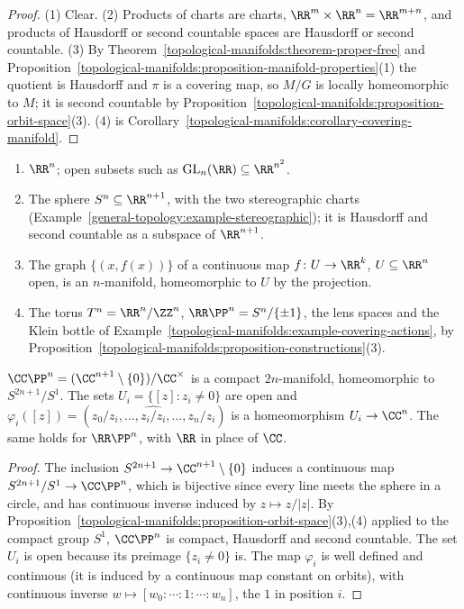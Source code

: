 \begin{proof}
(1) Clear. (2) Products of charts are charts, $\RR^m \times \RR^n = \RR^{m+n}$, and products of Hausdorff or second countable spaces are Hausdorff or second countable. (3) By
Theorem~\ref{topological-manifolds:theorem-proper-free} and Proposition~\ref{topological-manifolds:proposition-manifold-properties}(1) the quotient is Hausdorff and $\pi$ is a covering map, so $M/G$ is locally homeomorphic to
$M$; it is second countable by Proposition~\ref{topological-manifolds:proposition-orbit-space}(3). (4) is Corollary~\ref{topological-manifolds:corollary-covering-manifold}.
\end{proof}

\begin{example}\label{topological-manifolds:example-manifolds}
\begin{enumerate}
\item $\RR^n$; open subsets such as $\mathrm{GL}_n(\RR) \subseteq \RR^{n^2}$.
\item The sphere $S^n \subseteq \RR^{n+1}$, with the two stereographic charts (Example~\ref{general-topology:example-stereographic}); it is Hausdorff and second countable as a subspace of $\RR^{n+1}$.
\item The graph $\{(x, f(x))\}$ of a continuous map $f \colon U \to \RR^k$, $U \subseteq \RR^n$ open, is an $n$-manifold, homeomorphic to $U$ by the projection.
\item The torus $T^n = \RR^n/\ZZ^n$, $\RR\PP^n = S^n/\{\pm1\}$, the lens spaces and the Klein bottle of Example~\ref{topological-manifolds:example-covering-actions}, by Proposition~\ref{topological-manifolds:proposition-constructions}(3).
\end{enumerate}
\end{example}

\begin{proposition}\label{topological-manifolds:proposition-projective-spaces}
$\CC\PP^n = (\CC^{n+1} \setminus \{0\})/\CC^\times$ is a compact $2n$-manifold, homeomorphic to $S^{2n+1}/S^1$. The sets $U_i = \{[z] : z_i \neq 0\}$ are open and $\varphi_i([z]) = (z_0/z_i, \ldots, \widehat{z_i/z_i}, \ldots, z_n/z_i)$ is a
homeomorphism $U_i \to \CC^n$. The same holds for $\RR\PP^n$, with $\RR$ in place of $\CC$.
\end{proposition}

\begin{proof}
The inclusion $S^{2n+1} \to \CC^{n+1} \setminus \{0\}$ induces a continuous map $S^{2n+1}/S^1 \to \CC\PP^n$, which is bijective since every line meets the sphere in a circle, and has continuous inverse induced by
$z \mapsto z/|z|$. By Proposition~\ref{topological-manifolds:proposition-orbit-space}(3),(4) applied to the compact group $S^1$, $\CC\PP^n$ is compact, Hausdorff and second countable. The set $U_i$ is open because its preimage
$\{z_i \neq 0\}$ is. The map $\varphi_i$ is well defined and continuous (it is induced by a continuous map constant on orbits), with continuous inverse $w \mapsto [w_0 : \cdots : 1 : \cdots : w_n]$, the $1$ in position $i$.
\end{proof}

